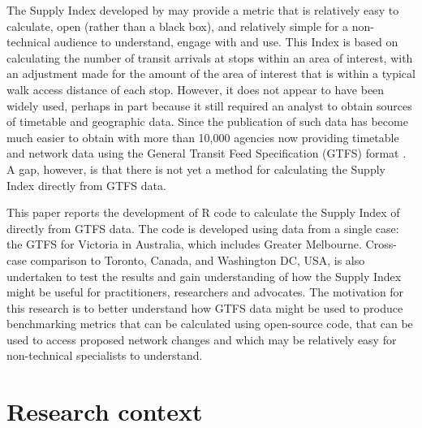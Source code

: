 \documentclass[]{tufte-book}
\begin{document}
The Supply Index developed by \citet{currie2007identifying} may provide
a metric that is relatively easy to calculate, open (rather than a black
box), and relatively simple for a non-technical audience to understand,
engage with and use. This Index is based on calculating the number of
transit arrivals at stops within an area of interest, with an adjustment
made for the amount of the area of interest that is within a typical
walk access distance of each stop. However, it does not appear to have
been widely used, perhaps in part because it still required an analyst
to obtain sources of timetable and geographic data. Since the
publication of \citet{currie2007identifying} such data has become much
easier to obtain with more than 10,000 agencies now providing timetable
and network data using the General Transit Feed Specification (GTFS)
format \citep{GTFS}. A gap, however, is that there is not yet a method
for calculating the \citet{currie2007identifying} Supply Index directly
from GTFS data.

This paper reports the development of R code to calculate the Supply
Index of \citet{currie2007identifying} directly from GTFS data. The code
is developed using data from a single case: the GTFS for Victoria in
Australia, which includes Greater Melbourne. Cross-case comparison to
Toronto, Canada, and Washington DC, USA, is also undertaken to test the
results and gain understanding of how the Supply Index might be useful
for practitioners, researchers and advocates. The motivation for this
research is to better understand how GTFS data might be used to produce
benchmarking metrics that can be calculated using open-source code, that
can be used to access proposed network changes and which may be
relatively easy for non-technical specialists to understand.

\hypertarget{research-context}{%
\chapter{Research context}\label{research-context}}
\end{document}
